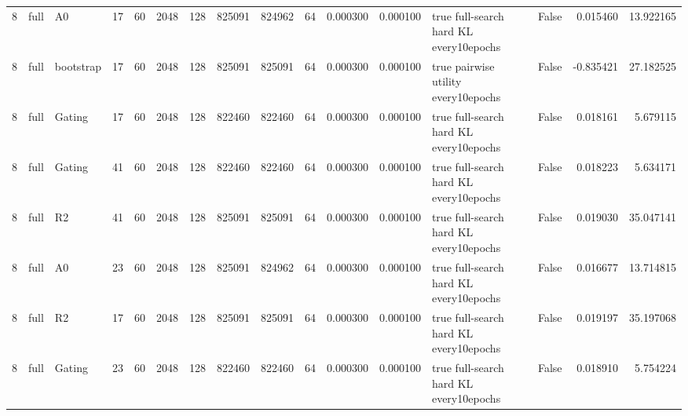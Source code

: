 \begin{tabular}{rllrrrrrrrrrlrrr}
8 & full & A0 & 17 & 60 & 2048 & 128 & 825091 & 824962 & 64 & 0.000300 & 0.000100 & true full-search hard KL every10epochs & False & 0.015460 & 13.922165 \\
8 & full & bootstrap & 17 & 60 & 2048 & 128 & 825091 & 825091 & 64 & 0.000300 & 0.000100 & true pairwise utility every10epochs & False & -0.835421 & 27.182525 \\
8 & full & Gating & 17 & 60 & 2048 & 128 & 822460 & 822460 & 64 & 0.000300 & 0.000100 & true full-search hard KL every10epochs & False & 0.018161 & 5.679115 \\
8 & full & Gating & 41 & 60 & 2048 & 128 & 822460 & 822460 & 64 & 0.000300 & 0.000100 & true full-search hard KL every10epochs & False & 0.018223 & 5.634171 \\
8 & full & R2 & 41 & 60 & 2048 & 128 & 825091 & 825091 & 64 & 0.000300 & 0.000100 & true full-search hard KL every10epochs & False & 0.019030 & 35.047141 \\
8 & full & A0 & 23 & 60 & 2048 & 128 & 825091 & 824962 & 64 & 0.000300 & 0.000100 & true full-search hard KL every10epochs & False & 0.016677 & 13.714815 \\
8 & full & R2 & 17 & 60 & 2048 & 128 & 825091 & 825091 & 64 & 0.000300 & 0.000100 & true full-search hard KL every10epochs & False & 0.019197 & 35.197068 \\
8 & full & Gating & 23 & 60 & 2048 & 128 & 822460 & 822460 & 64 & 0.000300 & 0.000100 & true full-search hard KL every10epochs & False & 0.018910 & 5.754224 \\
\bottomrule
\end{tabular}
